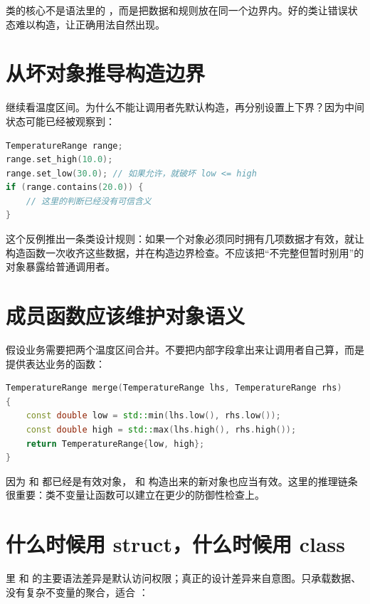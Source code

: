 \begin{keyidea}
类的核心不是语法里的 ，而是把数据和规则放在同一个边界内。好的类让错误状态难以构造，让正确用法自然出现。
\end{keyidea}

\section{从坏对象推导构造边界}

继续看温度区间。为什么不能让调用者先默认构造，再分别设置上下界？因为中间状态可能已经被观察到：

\begin{lstlisting}[language=C++,caption={分步设置制造临时坏状态}]
TemperatureRange range;
range.set_high(10.0);
range.set_low(30.0); // 如果允许，就破坏 low <= high
if (range.contains(20.0)) {
    // 这里的判断已经没有可信含义
}
\end{lstlisting}

这个反例推出一条类设计规则：如果一个对象必须同时拥有几项数据才有效，就让构造函数一次收齐这些数据，并在构造边界检查。不应该把“不完整但暂时别用”的对象暴露给普通调用者。

\section{成员函数应该维护对象语义}

假设业务需要把两个温度区间合并。不要把内部字段拿出来让调用者自己算，而是提供表达业务的函数：

\begin{lstlisting}[language=C++,caption={合并两个有效区间}]
TemperatureRange merge(TemperatureRange lhs, TemperatureRange rhs)
{
    const double low = std::min(lhs.low(), rhs.low());
    const double high = std::max(lhs.high(), rhs.high());
    return TemperatureRange{low, high};
}
\end{lstlisting}

因为  和  都已经是有效对象， 和  构造出来的新对象也应当有效。这里的推理链条很重要：类不变量让函数可以建立在更少的防御性检查上。

\section{什么时候用 struct，什么时候用 class}

\cpp 里  和  的主要语法差异是默认访问权限；真正的设计差异来自意图。只承载数据、没有复杂不变量的聚合，适合 ：

